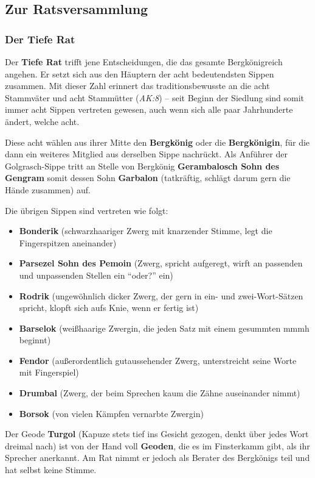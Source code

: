 
\subsection{Zur Ratsversammlung}
\subsubsection{Der Tiefe Rat}
Der \textbf{Tiefe Rat} trifft jene Entscheidungen, die das  gesamte Bergkönigreich angehen.
Er setzt sich aus den Häuptern der acht bedeutendsten Sippen zusammen.
Mit dieser Zahl erinnert das traditionsbewusste \fkv an die acht Stammväter und acht Stammütter (\emph{AK:8}) --
seit Beginn der Siedlung sind somit immer acht Sippen vertreten gewesen, auch wenn sich alle paar Jahrhunderte ändert, welche acht.


Diese acht wählen aus ihrer Mitte den \textbf{Bergkönig} oder die \textbf{Bergkönigin}, für die dann ein weiteres Mitglied aus derselben Sippe nachrückt.
Als Anführer der Golgrasch-Sippe tritt an Stelle von Bergkönig \textbf{Gerambalosch Sohn des Gengram} somit dessen Sohn
\textbf{Garbalon} (tatkräftig, schlägt darum gern die Hände zusammen) auf.

\neuespalte

Die übrigen Sippen sind vertreten wie folgt:
\begin{itemize}
	\label{rat}
\item \textbf{Bonderik} (schwarzhaariger Zwerg mit knarzender Stimme, legt die Fingerspitzen aneinander)
\item \textbf{Parsezel Sohn des Pemoin} (Zwerg, spricht aufgeregt, wirft an passenden und unpassenden Stellen ein \enquote{oder?} ein)
\item \textbf{Rodrik} (ungewöhnlich dicker Zwerg, der gern in ein- und zwei-Wort-Sätzen spricht, klopft sich aufs Knie, wenn er fertig ist)
\item \textbf{Barselok} (weißhaarige Zwergin, die jeden Satz mit einem gesummten mmmh beginnt)
\item \textbf{Fendor} (außerordentlich gutaussehender Zwerg, unterstreicht seine Worte mit Fingerspiel)
\item \textbf{Drumbal} (Zwerg, der beim Sprechen kaum die Zähne auseinander nimmt)
\item \textbf{Borsok}  (von vielen Kämpfen vernarbte Zwergin)
\end{itemize}

Der Geode \textbf{Turgol} (Kapuze stets tief ins Gesicht gezogen, denkt über jedes Wort dreimal nach) ist von der Hand voll \textbf{Geoden}, die es im Finsterkamm gibt, als ihr Sprecher anerkannt.
Am Rat nimmt er jedoch als Berater des Bergkönigs teil und hat selbst keine Stimme.

